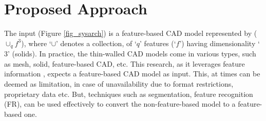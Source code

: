 \section{Proposed Approach}
\label{sec:approach}
The input  (Figure \ref{fig_sysarch}) is a feature-based CAD model represented by  ($\cup_qf^3$), where `$\cup$' denotes a collection, of `$q$' features (`$f$') having dimensionality `$3$' (solids). In practice, the thin-walled CAD models come in various types, such as mesh, solid, feature-based CAD, etc. This research, as it leverages feature information \cite{YogeshCOEP2013}, expects a feature-based CAD model as input. This, at times can be deemed as limitation, in case of unavailability due to format restrictions, proprietary data etc. But, techniques such as segmentation, feature recognition (FR), can be used effectively to convert the non-feature-based model to a feature-based one.


